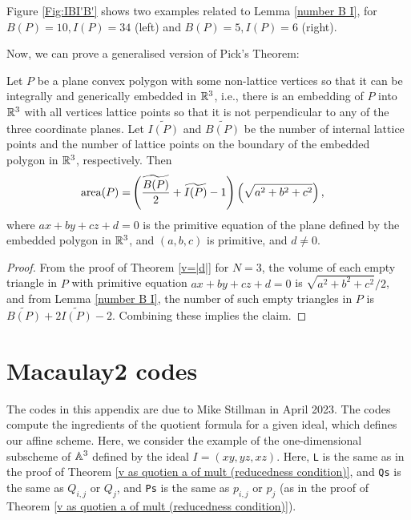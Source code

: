 \documentclass[11pt,a4paper,leqno,noamsfonts]{amsart}
\numberwithin{equation}{section}
\begin{document}
\begin{example}Figure \ref{Fig:IBI'B'} shows two examples related to Lemma \ref{number B I}, for $B(P)=10, I(P)=34$ (left) and $B(P)=5, I(P)=6$ (right).
    

\end{example}
Now, we can prove a generalised version of Pick's Theorem:
\begin{theorem} \label{Pick's}
    Let $P$ be a plane convex polygon with some non-lattice vertices so that it can be integrally and generically embedded in ${\mathbb{R}}^3$, i.e., there is an embedding of $P$ into ${\mathbb{R}}^3$ with all vertices lattice points so that it is not perpendicular to any of the three coordinate planes.  Let $\widetilde{I(P)}$ and $\widetilde{B(P)}$ be the number of internal lattice points and the number of lattice points on the boundary of the embedded polygon in ${\mathbb{R}}^3$, respectively.  Then
    \begin{align*}
        {\mathrm{area}}(P)=&\left(\frac{\widetilde{B(P)}}{2}+\widetilde{I(P)}-1\right)\left(\sqrt{a^2+b^2+c^2}\right),
    \end{align*}
    where $ax+by+cz+d=0$ is the primitive equation of the plane defined by the embedded polygon in ${\mathbb{R}}^3$, and $(a,b,c)$ is primitive, and $d\neq 0$.
\end{theorem}

\begin{proof}
From the proof of Theorem \ref{v=|d|} for $N=3$, the volume of each empty triangle in $P$ with primitive equation $ax+by+cz+d=0$ is $\sqrt{a^2+b^2+c^2}/2$, and from  Lemma \ref{number B I}, the number of such empty triangles in $P$ is $\widetilde{B(P)}+2\widetilde{I(P)}-2$. Combining these implies the claim.


   
\end{proof}





\section{Macaulay2 codes}\label{App: M2Codes}
The codes in this appendix are due to Mike Stillman in April 2023. The codes compute the ingredients of the quotient formula for a given ideal, which defines our affine scheme. Here, we consider the example of the one-dimensional subscheme of ${\mathbb{A}}^3$ defined by the ideal $I=(xy,yz,xz)$. Here, \verb+L+ is the same as in the proof of Theorem \ref{v as quotien a of mult (reducedness condition)}, and \verb+Qs+ is the same as $Q_{i,j}$ or $Q_j$, and \verb+Ps+ is the same as $p_{i,j}$ or $p_j$ (as in the proof of Theorem \ref{v as quotien a of mult (reducedness condition)}).
\vspace{0.2cm}
\end{document}

